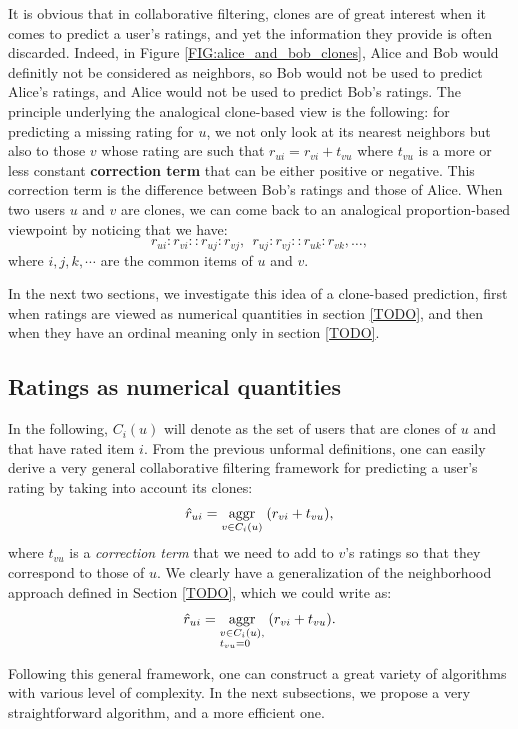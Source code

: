 It is obvious that in collaborative filtering, clones are of great interest
when it comes to predict a user's ratings, and yet the information they provide
is often discarded. Indeed, in Figure \ref{FIG:alice_and_bob_clones}, Alice and
Bob would definitly not be considered as neighbors, so Bob would not be used to
predict Alice's ratings, and Alice would not be used to predict Bob's ratings.
The principle underlying the analogical clone-based view is the following: for
predicting a missing rating for $u$, we not only look at its nearest neighbors
but also to those $v$ whose rating are such that $r_{ui} = r_{vi} + t_{vu}$
where $t_{vu}$ is a more or less constant \textbf{correction term} that can be
either positive or negative. This correction term is the difference between
Bob's ratings and those of Alice. When two users $u$ and $v$ are clones, we can
come back to an analogical proportion-based viewpoint by noticing that we have:
$$r_{ui} : r_{vi} :: r_{uj} : r_{vj},~~ r_{uj} : r_{vj} :: r_{uk} : r_{vk},
\dots,$$
where $i, j, k, \cdots$ are the common items of $u$ and $v$.


In the next two sections, we investigate this idea of a clone-based prediction,
first when ratings are viewed as numerical quantities in section
\ref{TODO}, and then when they have an ordinal meaning only in
section \ref{TODO}.

\subsection{Ratings as numerical quantities}

In the following, $C_i(u)$ will denote as the set of users that are clones of
$u$ and that have rated item $i$. From the previous unformal definitions, one
can easily derive a very general collaborative filtering framework for
predicting a user's rating by taking into account its clones: $$\hat{r}_{ui} =
\underset{v \in C_i(u)}{\operatorname{aggr}}\;(r_{vi} + t_{vu}),$$
where $t_{vu}$ is a \textit{correction term} that we need to add to $v$'s
ratings so that they correspond to those of $u$. We clearly have a
generalization of the neighborhood approach defined in Section \ref{TODO},
which we could write as:
$$\hat{r}_{ui} = \underset{\begin{subarray}{l}v \in C_i(u),\\ t_{vu} = 0\end{subarray}}{\operatorname{aggr}}\;(r_{vi} + t_{vu}).$$

Following this general framework, one can construct a great variety of
algorithms with various level of complexity. In the next subsections, we
propose a very straightforward algorithm, and a more efficient one.

